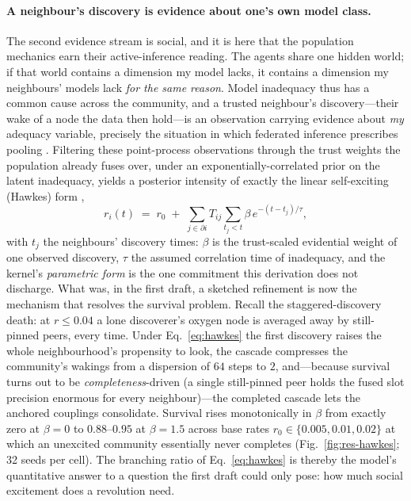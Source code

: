 \documentclass[11pt]{article}
\begin{document}
\paragraph{A neighbour's discovery is evidence about one's own model class.}
The second evidence stream is social, and it is here that the population mechanics earn their
active-inference reading. The agents share one hidden world; if that world contains a dimension
my model lacks, it contains a dimension my neighbours' models lack \emph{for the same reason}.
Model inadequacy thus has a common cause across the community, and a trusted neighbour's
discovery---their wake of a node the data then hold---is an observation carrying evidence about
\emph{my} adequacy variable, precisely the situation in which federated inference prescribes
pooling \citep{friston2023federated,waade2025}. Filtering these point-process observations
through the trust weights the population already fuses over, under an exponentially-correlated
prior on the latent inadequacy, yields a posterior intensity of exactly the linear self-exciting
(Hawkes) form \citep{hawkes1971},
\begin{equation}
r_i(t) \;=\; r_0 \;+\; \sum_{j\in\partial i} T_{ij} \sum_{t_j<t} \beta\, e^{-(t-t_j)/\tau},
\label{eq:hawkes}
\end{equation}
with $t_j$ the neighbours' discovery times: $\beta$ is the trust-scaled evidential weight of one
observed discovery, $\tau$ the assumed correlation time of inadequacy, and the kernel's
\emph{parametric form} is the one commitment this derivation does not discharge. What was, in the
first draft, a sketched refinement is now the mechanism that resolves the survival problem.
Recall the staggered-discovery death: at $r\le0.04$ a lone discoverer's oxygen node is averaged
away by still-pinned peers, every time. Under Eq.~\eqref{eq:hawkes} the first discovery raises
the whole neighbourhood's propensity to look, the cascade compresses the community's wakings from
a dispersion of $64$ steps to $2$, and---because survival turns out to be
\emph{completeness}-driven (a single still-pinned peer holds the fused slot precision enormous
for every neighbour)---the completed cascade lets the anchored couplings consolidate. Survival
rises monotonically in $\beta$ from exactly zero at $\beta=0$ to $0.88$--$0.95$ at $\beta=1.5$
across base rates $r_0\in\{0.005,0.01,0.02\}$ at which an unexcited community essentially never
completes (Fig.~\ref{fig:res-hawkes}; 32 seeds per cell). The branching ratio of
Eq.~\eqref{eq:hawkes} is thereby the model's quantitative answer to a question the first draft
could only pose: how much social excitement does a revolution need.
\end{document}
